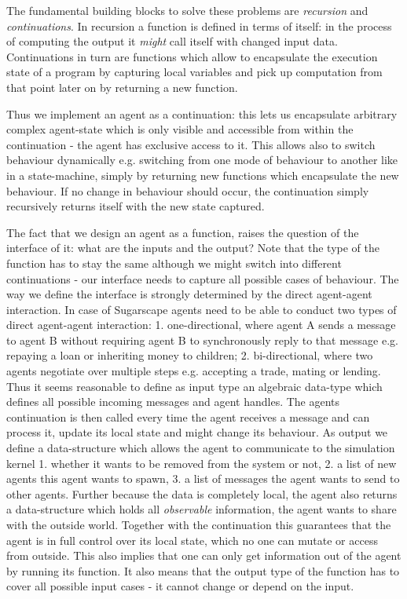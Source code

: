The fundamental building blocks to solve these problems are \textit{recursion} and \textit{continuations}. In recursion a function is defined in terms of itself: in the process of computing the output it \textit{might} call itself with changed input data. Continuations in turn are functions which allow to encapsulate the execution state of a program by capturing local variables and pick up computation from that point later on by returning a new function.

Thus we implement an agent as a continuation: this lets us encapsulate arbitrary complex agent-state which is only visible and accessible from within the continuation - the agent has exclusive access to it. This allows also to switch behaviour dynamically e.g. switching from one mode of behaviour to another like in a state-machine, simply by returning new functions which encapsulate the new behaviour. If no change in behaviour should occur, the continuation simply recursively returns itself with the new state captured.

The fact that we design an agent as a function, raises the question of the interface of it: what are the inputs and the output? Note that the type of the function has to stay the same although we might switch into different continuations - our interface needs to capture all possible cases of behaviour. The way we define the interface is strongly determined by the direct agent-agent interaction. In case of Sugarscape agents need to be able to conduct two types of direct agent-agent interaction: 1. one-directional, where agent A sends a message to agent B without requiring agent B to synchronously reply to that message e.g. repaying a loan or inheriting money to children; 2. bi-directional, where two agents negotiate over multiple steps e.g. accepting a trade, mating or lending.
Thus it seems reasonable to define as input type an algebraic data-type which defines all possible incoming messages and agent handles. The agents continuation is then called every time the agent receives a message and can process it, update its local state and might change its behaviour.
As output we define a data-structure which allows the agent to communicate to the simulation kernel 1. whether it wants to be removed from the system or not, 2. a list of new agents this agent wants to spawn, 3. a list of messages the agent wants to send to other agents. Further because the data is completely local, the agent also returns a data-structure which holds all \textit{observable} information, the agent wants to share with the outside world. Together with the continuation this guarantees that the agent is in full control over its local state, which no one can mutate or access from outside. This also implies that one can only get information out of the agent by running its function. It also means that the output type of the function has to cover all possible input cases - it cannot change or depend on the input. 

